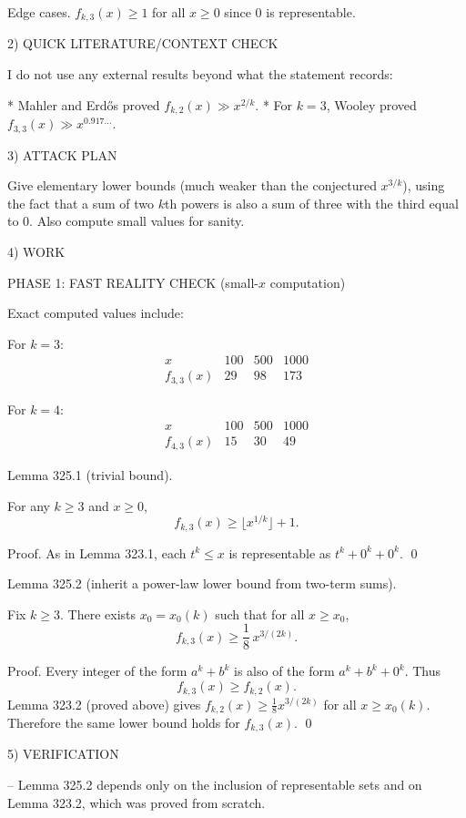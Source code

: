 Edge cases.
$f_{k,3}(x)\ge 1$ for all $x\ge 0$ since $0$ is representable.


2) QUICK LITERATURE/CONTEXT CHECK

I do not use any external results beyond what the statement records:

* Mahler and Erd\H{o}s proved $f_{k,2}(x)\gg x^{2/k}$.
* For $k=3$, Wooley proved $f_{3,3}(x)\gg x^{0.917\dots}$.


3) ATTACK PLAN

Give elementary lower bounds (much weaker than the conjectured $x^{3/k}$), using the fact that a sum of two $k$th powers is also a sum of three with the third equal to $0$.
Also compute small values for sanity.


4) WORK

PHASE 1: FAST REALITY CHECK (small-$x$ computation)

Exact computed values include:

For $k=3$:
\[
\begin{array}{c|ccc}
x & 100 & 500 & 1000\\\hline
f_{3,3}(x) & 29 & 98 & 173
\end{array}
\]

For $k=4$:
\[
\begin{array}{c|ccc}
x & 100 & 500 & 1000\\\hline
f_{4,3}(x) & 15 & 30 & 49
\end{array}
\]


Lemma 325.1 (trivial bound).

For any $k\ge 3$ and $x\ge 0$,
\[
f_{k,3}(x)\ge \lfloor x^{1/k}\rfloor+1.
\]

Proof.
As in Lemma 323.1, each $t^k\le x$ is representable as $t^k+0^k+0^k$. \qed


Lemma 325.2 (inherit a power-law lower bound from two-term sums).

Fix $k\ge 3$. There exists $x_0=x_0(k)$ such that for all $x\ge x_0$,
\[
f_{k,3}(x)\ge \frac{1}{8}\,x^{3/(2k)}.
\]

Proof.
Every integer of the form $a^k+b^k$ is also of the form $a^k+b^k+0^k$.
Thus
\[
f_{k,3}(x)\ge f_{k,2}(x).
\]
Lemma 323.2 (proved above) gives $f_{k,2}(x)\ge \tfrac18 x^{3/(2k)}$ for all $x\ge x_0(k)$.
Therefore the same lower bound holds for $f_{k,3}(x)$. \qed


5) VERIFICATION

-- Lemma 325.2 depends only on the inclusion of representable sets and on Lemma 323.2, which was proved from scratch.


